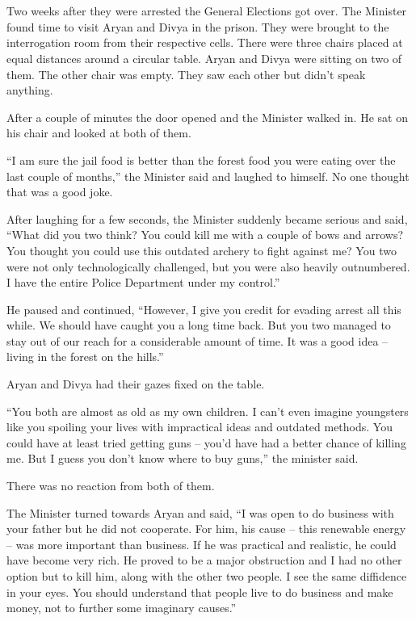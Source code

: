 \chapter{}

Two weeks after they were arrested the General Elections got over. The Minister
found time to visit Aryan and Divya in the prison. They were brought to the
interrogation room from their respective cells. There were three chairs placed
at equal distances around a circular table. Aryan and Divya were sitting on two
of them. The other chair was empty. They saw each other but didn't speak
anything.

After a couple of minutes the door opened and the Minister walked in. He sat on
his chair and looked at both of them.

“I am sure the jail food is better than the forest food you were eating over the
last couple of months,” the Minister said and laughed to himself. No one thought
that was a good joke.

After laughing for a few seconds, the Minister suddenly became serious and said,
“What did you two think? You could kill me with a couple of bows and arrows? You
thought you could use this outdated archery to fight against me? You two were
not only technologically challenged, but you were also heavily outnumbered. I
have the entire Police Department under my control.”

He paused and continued, “However, I give you credit for evading arrest all this
while. We should have caught you a long time back. But you two managed to stay
out of our reach for a considerable amount of time. It was a good idea – living
in the forest on the hills.”

Aryan and Divya had their gazes fixed on the table.

“You both are almost as old as my own children. I can't even imagine youngsters
like you spoiling your lives with impractical ideas and outdated methods. You
could have at least tried getting guns – you'd have had a better chance of
killing me. But I guess you don't know where to buy guns,” the minister said.

There was no reaction from both of them.

The Minister turned towards Aryan and said, “I was open to do business with your
father but he did not cooperate. For him, his cause – this renewable energy –
was more important than business. If he was practical and realistic, he could
have become very rich. He proved to be a major obstruction and I had no other
option but to kill him, along with the other two people. I see the same
diffidence in your eyes. You should understand that people live to do business
and make money, not to further some imaginary causes.”

